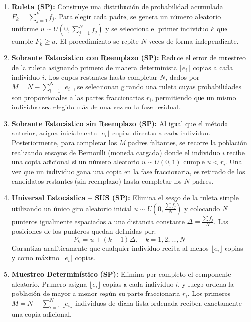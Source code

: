 \documentclass[11pt,letterpaper]{article}
\begin{document}
\begin{enumerate}
    \item \textbf{Ruleta (SP):} Construye una distribución de probabilidad acumulada $F_k = \sum_{j=1}^{k} f_j$. Para elegir cada padre, se genera un número aleatorio uniforme $u \sim U\left(0, \sum_{j=1}^{N} f_j\right)$ y se selecciona el primer individuo $k$ que cumple $F_k \ge u$. El procedimiento se repite $N$ veces de forma independiente.
    
    \item \textbf{Sobrante Estocástico con Reemplazo (SP):} Reduce el error de muestreo de la ruleta asignando primero de manera determinista $\lfloor e_i \rfloor$ copias a cada individuo $i$. Los cupos restantes hasta completar $N$, dados por $M = N - \sum_{i=1}^{N} \lfloor e_i \rfloor$, se seleccionan girando una ruleta cuyas probabilidades son proporcionales a las partes fraccionarias $r_i$, permitiendo que un mismo individuo sea elegido más de una vez en la fase residual.
    
    \item \textbf{Sobrante Estocástico sin Reemplazo (SP):} Al igual que el método anterior, asigna inicialmente $\lfloor e_i \rfloor$ copias directas a cada individuo. Posteriormente, para completar los $M$ padres faltantes, se recorre la población realizando ensayos de Bernoulli (moneda cargada) donde el individuo $i$ recibe una copia adicional si un número aleatorio $u \sim U(0,1)$ cumple $u < r_i$. Una vez que un individuo gana una copia en la fase fraccionaria, es retirado de los candidatos restantes (sin reemplazo) hasta completar los $N$ padres.
    
    \item \textbf{Universal Estocástica -- SUS (SP):} Elimina el sesgo de la ruleta simple utilizando un único giro aleatorio inicial $u \sim U\left(0, \frac{\sum f_j}{N}\right)$ y colocando $N$ punteros igualmente espaciados a una distancia constante $\Delta = \frac{\sum f_j}{N}$. Las posiciones de los punteros quedan definidas por:
    \begin{equation}
        P_k = u + (k - 1)\Delta, \quad k = 1, 2, \dots, N
    \end{equation}
    Garantiza analíticamente que cualquier individuo reciba al menos $\lfloor e_i \rfloor$ copias y como máximo $\lceil e_i \rceil$ copias.
    
    \item \textbf{Muestreo Determinístico (SP):} Elimina por completo el componente aleatorio. Primero asigna $\lfloor e_i \rfloor$ copias a cada individuo $i$, y luego ordena la población de mayor a menor según su parte fraccionaria $r_i$. Los primeros $M = N - \sum_{i=1}^{N} \lfloor e_i \rfloor$ individuos de dicha lista ordenada reciben exactamente una copia adicional.
\end{enumerate}
\end{document}
